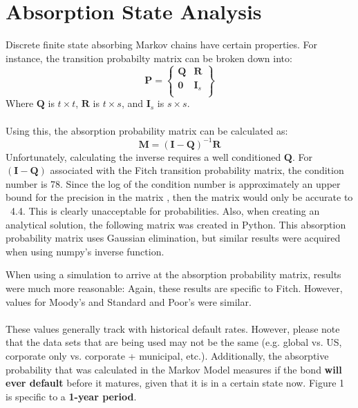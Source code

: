 \documentclass[a4paper, 11pt]{article}
\begin{document}
\section{Absorption State Analysis}

Discrete finite state absorbing Markov chains have certain properties\cite{absorbing_state}. For instance, the transition probabilty matrix can be broken down into:
$$
\mathbf{P} = \begin{Bmatrix}
	\mathbf{Q} & \mathbf{R} \\
	\mathbf{0} & \mathbf{I}_{s} \\
\end{Bmatrix}
$$
Where $\mathbf{Q}$ is $t \times t$, $\mathbf{R}$ is $t \times s$, and $\mathbf{I}_{s}$ is $s \times s$.\\
\\
Using this, the absorption probability matrix \cite{absorbing_state_wolfram} can be calculated as:
$$  \mathbf{M} = (\mathbf{I}-\mathbf{Q})^{-1} \mathbf{R}$$
Unfortunately, calculating the inverse requires a well conditioned $\mathbf{Q}$. For $(\mathbf{I}-\mathbf{Q})$ associated with the Fitch transition probability matrix, the condition number is 78. Since the log of the condition number is approximately an upper bound for the precision in the matrix \cite{condtion_number}, then the matrix would only be accurate to ~4.4. This is clearly unacceptable for probabilities. Also, when creating an analytical solution, the following matrix was created in Python. This absorption probability matrix uses Gaussian elimination, but similar results were acquired when using numpy's inverse function.\\
	\small{}

When using a simulation to arrive at the absorption probability matrix, results were much more reasonable:
	\small{}
Again, these results are specific to Fitch. However, values for Moody's and Standard and Poor's were similar.\\
\\
These values generally track with historical default rates. However, please note that the data sets that are being used may not be the same (e.g. global vs. US, corporate only vs. corporate + municipal, etc.). Additionally, the absorptive probability that was calculated in the Markov Model measures if the bond \textbf{will ever default} before it matures, given that it is in a certain state now. Figure 1 is specific to a \textbf{1-year period}.
\end{document}
